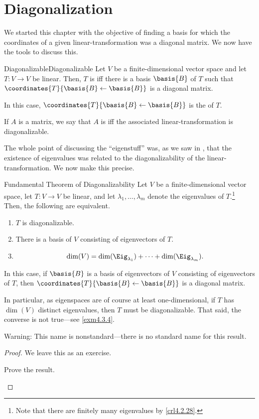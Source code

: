 \section{Diagonalization}

We started this chapter with the objective of finding a basis for which the coordinates of a given linear-transformation was a diagonal matrix.  We now have the tools to discuss this.
\begin{dfn}{Diagonalizable}{Diagonalizable}
	Let $V$ be a finite-dimensional vector space and let $T\colon V\rightarrow V$ be linear.  Then, $T$ is  iff there is a basis $\basis{B}$ of $T$ such that $\coordinates{T}{\basis{B}\leftarrow \basis{B}}$ is a diagonal matrix.
	\begin{rmk}
		In this case, $\coordinates{T}{\basis{B}\leftarrow \basis{B}}$ is the  of $T$.
	\end{rmk}
	\begin{rmk}
		If $A$ is a matrix, we say that $A$ is  iff the associated linear-transformation is diagonalizable.
	\end{rmk}
\end{dfn}
The whole point of discussing the ``eigenstuff'' was, as we saw in , that the existence of eigenvalues was related to the diagonalizability of the linear-transformation.  We now make this precise.
\begin{thm}{Fundamental Theorem of Diagonalizability}{}
	Let $V$ be a finite-dimensional vector space, let $T\colon V\rightarrow V$ be linear, and let $\lambda _1,\ldots ,\lambda _m$ denote the eigenvalues of $T$.\footnote{Note that there are finitely many eigenvalues by \cref{crl4.2.28}.}  Then, the following are equivalent.
	\begin{enumerate}
		\item $T$ is diagonalizable.
		\item There is a basis of $V$ consisting of eigenvectors of $T$.
		\item
		\begin{equation}
			\dim (V)=\dim (\Eig _{\lambda _1})+\cdots +\dim (\Eig _{\lambda _m}).
		\end{equation}
	\end{enumerate}
	In this case, if $\basis{B}$ is a basis of eigenvectors of $V$ consisting of eigenvectors of $T$, then $\coordinates{T}{\basis{B}\leftarrow \basis{B}}$ is a diagonal matrix.
	\begin{rmk}
		In particular, as eigenspaces are of course at least one-dimensional, if $T$ has $\dim (V)$ distinct eigenvalues, then $T$ must be diagonalizable.  That said, the converse is not true---see \cref{exm4.3.4}.
	\end{rmk}
	\begin{rmk}
		Warning:  This name is nonstandard---there is no standard name for this result.
	\end{rmk}
	\begin{proof}
		We leave this as an exercise.
		\begin{exr}[breakable=false]{}{}
			Prove the result.
		\end{exr}
	\end{proof}
\end{thm}
